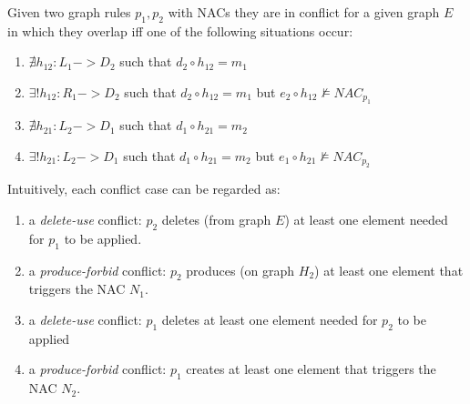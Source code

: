 \begin{definition}[Conflict]\label{def:classic-conflict} Given two graph rules $p_1, p_2$ with NACs they are in conflict for a given graph $E$ in which they overlap iff one of the following situations occur:

\begin{enumerate}
    \item $\nexists h_{12} : L_1 -> D_2$ such that $d_2 \circ h_{12} = m_1$
    \item $\exists! h_{12} : R_1 -> D_2$ such that $d_2 \circ h_{12} = m_1$ but $e_2 \circ h_{12} \not\models NAC_{p_1}$
    \item $\nexists h_{21} : L_2 -> D_1$ such that $d_1 \circ h_{21} = m_2$
    \item $\exists! h_{21} : L_2 -> D_1$ such that $d_1 \circ h_{21} = m_2$ but $e_1 \circ h_{21} \not\models NAC_{p_2}$
  \end{enumerate}

\end{definition}

Intuitively, each conflict case can be regarded as:

\begin{enumerate}
  \item a \emph{delete-use} conflict: $p_2$ deletes (from graph $E$) at least one element needed for $p_1$ to be applied.
  \item a \emph{produce-forbid} conflict: $p_2$ produces (on graph $H_2$) at least one element that triggers the NAC $N_1$.
  \item a \emph{delete-use} conflict: $p_1$ deletes at least one element needed for $p_2$ to be applied
  \item a \emph{produce-forbid} conflict: $p_1$ creates at least one element that triggers the NAC $N_2$.
\end{enumerate}
